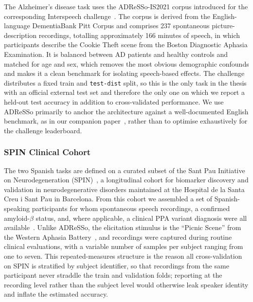 \documentclass[a4paper,12pt]{article}
\begin{document}
The Alzheimer's disease task uses the ADReSSo-IS2021 corpus introduced for the corresponding Interspeech challenge~\cite{luz2021adresso}. The corpus is derived from the English-language DementiaBank Pitt Corpus and comprises 237 spontaneous picture-description recordings, totalling approximately 166 minutes of speech, in which participants describe the Cookie Theft scene from the Boston Diagnostic Aphasia Examination. It is balanced between AD patients and healthy controls and matched for age and sex, which removes the most obvious demographic confounds and makes it a clean benchmark for isolating speech-based effects. The challenge distributes a fixed train and \texttt{test-dist} split, so this is the only task in the thesis with an official external test set and therefore the only one on which we report a held-out test accuracy in addition to cross-validated performance. We use ADReSSo primarily to anchor the architecture against a well-documented English benchmark, as in our companion paper~\cite{esteve2025speechadppa}, rather than to optimise exhaustively for the challenge leaderboard.

\subsubsection{SPIN Clinical Cohort}

The two Spanish tasks are defined on a curated subset of the Sant Pau Initiative on Neurodegeneration (SPIN)~\cite{alcolea2019spin}, a longitudinal cohort for biomarker discovery and validation in neurodegenerative disorders maintained at the Hospital de la Santa Creu i Sant Pau in Barcelona. From this cohort we assembled a set of Spanish-speaking participants for whom spontaneous speech recordings, a confirmed amyloid-$\beta$ status, and, where applicable, a clinical PPA variant diagnosis were all available~\cite{esteve2025speechadppa}. Unlike ADReSSo, the elicitation stimulus is the ``Picnic Scene'' from the Western Aphasia Battery~\cite{kertesz1982wab}, and recordings were captured during routine clinical evaluations, with a variable number of samples per subject ranging from one to seven. This repeated-measures structure is the reason all cross-validation on SPIN is stratified by subject identifier, so that recordings from the same participant never straddle the train and validation folds; reporting at the recording level rather than the subject level would otherwise leak speaker identity and inflate the estimated accuracy.
\end{document}
